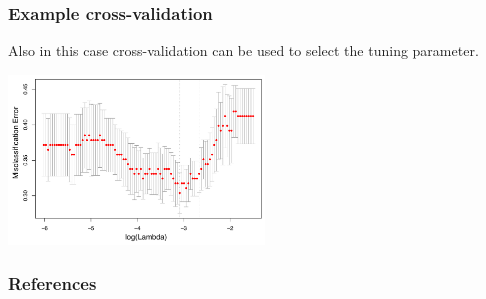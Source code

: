 \documentclass[notes]{beamer}          %
\begin{document}
\begin{frame}
\frametitle{Example cross-validation}

Also in this case cross-validation can be used to select the tuning parameter.

\begin{center}
\includegraphics[height=4.5cm]{../figures/week_2_linear_models/GDSC_logistic_regression_cross_validation.pdf}
\end{center}

\end{frame}


\begin{frame}
\frametitle{References}
\printbibliography
\end{frame}
\end{document}
